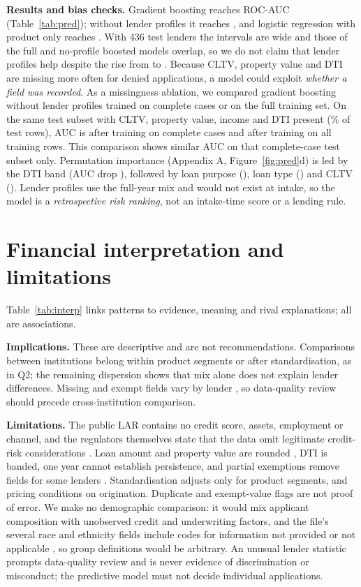 \documentclass[acmtog,nonacm]{acmart}
\begin{document}
\textbf{Results and bias checks.} Gradient boosting reaches ROC-AUC \GBAUC{} (Table~\ref{tab:pred}); without lender profiles it reaches \GBnAUC{}, and logistic regression with product only reaches \LRpAUC{}. With 436 test lenders the intervals are wide and those of the full and no-profile boosted models overlap, so we do not claim that lender profiles help despite the rise from \GBnAUC{} to \GBAUC{}. Because CLTV, property value and DTI are missing more often for denied applications, a model could exploit \emph{whether a field was recorded}. As a missingness ablation, we compared gradient boosting without lender profiles trained on complete cases or on the full training set. On the same test subset with CLTV, property value, income and DTI present (\AbShare\% of test rows), AUC is \AbGBcc{} after training on complete cases and \AbGBall{} after training on all training rows. This comparison shows similar AUC on that complete-case test subset only. Permutation importance (Appendix A, Figure~\ref{fig:pred}d) is led by the DTI band (AUC drop \ImpI{}), followed by loan purpose (\ImpII), loan type (\ImpIII) and CLTV (\ImpIV). Lender profiles use the full-year mix and would not exist at intake, so the model is a \emph{retrospective risk ranking}, not an intake-time score or a lending rule.





\section{Financial interpretation and limitations}\label{sec:limits}
Table~\ref{tab:interp} links patterns to evidence, meaning and rival explanations; all are associations.



\textbf{Implications.} These are descriptive and are not recommendations. Comparisons between institutions belong within product segments or after standardisation, as in Q2; the remaining dispersion shows that mix alone does not explain lender differences. Missing and exempt fields vary by lender \cite{gao21}, so data-quality review should precede cross-institution comparison.

\textbf{Limitations.} The public LAR contains no credit score, assets, employment or channel, and the regulators themselves state that the data omit legitimate credit-risk considerations \cite{ffiec2019}. Loan amount and property value are rounded \cite{cfpbpolicy}, DTI is banded, one year cannot establish persistence, and partial exemptions remove fields for some lenders \cite{gao21}. Standardisation adjusts only for product segments, and pricing conditions on origination. Duplicate and exempt-value flags are not proof of error. We make no demographic comparison: it would mix applicant composition with unobserved credit and underwriting factors, and the file's several race and ethnicity fields include codes for information not provided or not applicable \cite{ffieclar}, so group definitions would be arbitrary. An unusual lender statistic prompts data-quality review and is never evidence of discrimination or misconduct; the predictive model must not decide individual applications.
\end{document}
